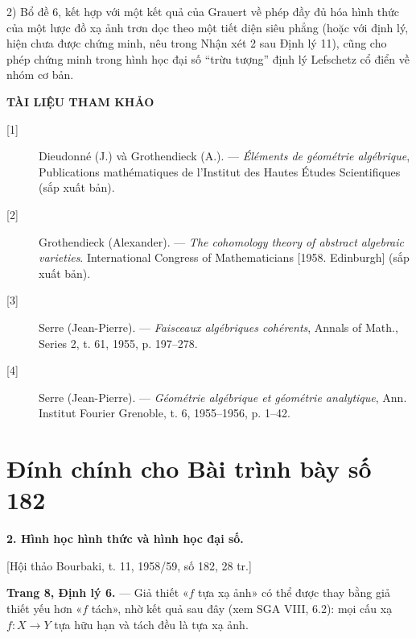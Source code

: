 \documentclass[11pt,twoside,openany]{book}
\numberwithin{equation}{section}
\newcommand{\src}[1]{%
  \phantomsection\hypertarget{src:\fgasourceid:#1}{}%
  \marginpar{\raggedleft\footnotesize\sffamily #1}%
}
\newcommand{\fgasourceid}{unset}
\newcommand{\sid}[1]{\gdef\fgasourceid{#1}\phantomsection\hypertarget{fga:#1}{}}
\begin{document}
2) Bổ đề 6, kết hợp với một kết quả của Grauert về phép đầy đủ hóa hình thức
của một lược đồ xạ ảnh trơn dọc theo một tiết diện siêu phẳng (hoặc với định
lý, hiện chưa được chứng minh, nêu trong Nhận xét 2 sau Định lý 11), cũng cho
phép chứng minh trong hình học đại số “trừu tượng” định lý Lefschetz cổ điển về
nhóm cơ bản.

\begin{center}
  \textbf{TÀI LIỆU THAM KHẢO}
\end{center}

\begin{description}
  \item[{[1]}] Dieudonné (J.) và Grothendieck (A.). --- \emph{Éléments de
    géométrie algébrique}, Publications mathématiques de l'Institut des Hautes
    Études Scientifiques (sắp xuất bản).
  \item[{[2]}] Grothendieck (Alexander). --- \emph{The cohomology theory of
    abstract algebraic varieties}. International Congress of Mathematicians
    [1958. Edinburgh] (sắp xuất bản).
  \item[{[3]}] Serre (Jean-Pierre). --- \emph{Faisceaux algébriques
    cohérents}, Annals of Math., Series 2, t. 61, 1955, p. 197--278.
  \item[{[4]}] Serre (Jean-Pierre). --- \emph{Géométrie algébrique et
    géométrie analytique}, Ann. Institut Fourier Grenoble, t. 6, 1955--1956,
    p. 1--42.
\end{description}

\par

\clearpage
\chapter*{Đính chính cho Bài trình bày số 182}
\setcounter{footnote}{1}
\sid{e182}
\src{298}

\noindent\textbf{2. Hình học hình thức và hình học đại số.}

\begin{center}
[Hội thảo Bourbaki, t. 11, 1958/59, số 182, 28 tr.]
\end{center}

\noindent\textbf{Trang 8, Định lý 6.} --- Giả thiết «$f$ tựa xạ ảnh» có thể
được thay bằng giả thiết yếu hơn «$f$ tách», nhờ kết quả sau đây (xem SGA VIII,
6.2): mọi cấu xạ $f:X\longrightarrow Y$ tựa hữu hạn và tách đều là tựa xạ ảnh.
\end{document}

